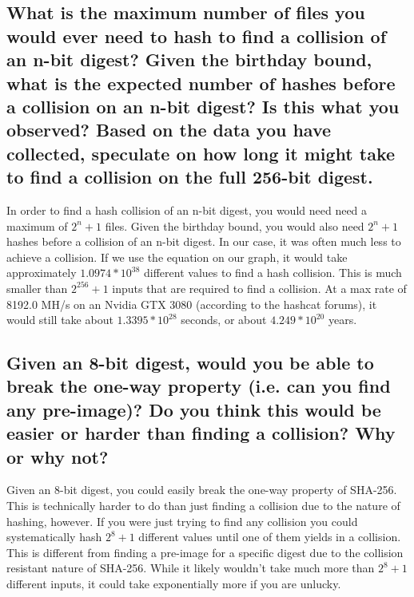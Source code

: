 \documentclass[11pt]{article}
\begin{document}
  \subsection{What is the maximum number of files you would ever need to hash 
  to find a collision of an n-bit digest? Given the birthday bound, what is the 
  expected number of hashes before a collision on an n-bit digest? Is this what
  you observed? Based on the data you have collected, speculate on how long it 
  might take to find a collision on the full 256-bit digest.}

      In order to find a hash collision of an n-bit digest, you would need 
      need a maximum of $2^n + 1$ files. Given the birthday bound, you would
      also need $2^n + 1$ hashes before a collision of an n-bit digest. In our 
      case, it was often much less to achieve a collision. If we use the 
      equation on our graph, it would take approximately
      $ 1.0974 * 10^{38}$ different values 
      to find a hash collision. This is much smaller than $2^{256} + 1$ 
      inputs that are required to find a collision. At a max rate of 8192.0 MH/s
      on an Nvidia GTX 3080 (according to the hashcat forums), it would still
      take about $1.3395*10^{28}$ seconds, or about $4.249 * 10^{20} $ years.

  \subsection{Given an 8-bit digest, would you be able to break the one-way 
  property (i.e. can you find any pre-image)? Do you think this would be 
  easier or harder than finding a collision? Why or why not?}

      Given an 8-bit digest, you could easily break the one-way property 
      of SHA-256. This is technically harder to do than just finding a
      collision due to the nature of hashing, however. If you were just trying 
      to find any collision you could systematically hash $2^8 + 1$ different 
      values until one of them yields in a collision. This is different from 
      finding a pre-image for a specific digest due to the collision resistant 
      nature of SHA-256. While it likely wouldn't take much more than $2^8 + 1$ 
      different inputs, it could take exponentially more if you are unlucky.
\end{document}
